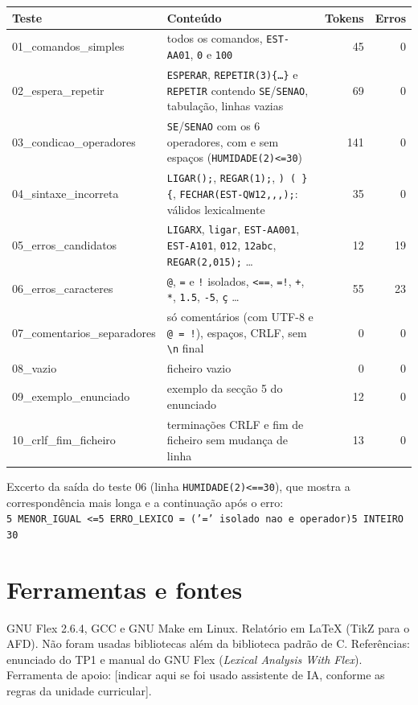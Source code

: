 \documentclass[10pt,a4paper]{article}
\newcommand{\tk}[1]{\texttt{#1}}
\begin{document}
\begin{center}\small
\begin{tabularx}{\textwidth}{@{}l>{\raggedright\arraybackslash}Xrr@{}}
\toprule
\textbf{Teste} & \textbf{Conteúdo} & \textbf{Tokens} & \textbf{Erros}\\
\midrule
01\_comandos\_simples & todos os comandos, \tk{EST-AA01}, \tk{0} e \tk{100} & 45 & 0\\
02\_espera\_repetir & \tk{ESPERAR}, \tk{REPETIR(3)\{\dots\}} e \tk{REPETIR} contendo \tk{SE}/\tk{SENAO}, tabulação, linhas vazias & 69 & 0\\
03\_condicao\_operadores & \tk{SE}/\tk{SENAO} com os 6 operadores, com e sem espaços (\tk{HUMIDADE(2)<=30}) & 141 & 0\\
04\_sintaxe\_incorreta & \tk{LIGAR();}, \tk{REGAR(1);}, \tk{) ( \} \{}, \tk{FECHAR(EST-QW12,,,);}: válidos lexicalmente & 35 & 0\\
05\_erros\_candidatos & \tk{LIGARX}, \tk{ligar}, \tk{EST-AA001}, \tk{EST-A101}, \tk{012}, \tk{12abc}, \tk{REGAR(2,015);} \dots & 12 & 19\\
06\_erros\_caracteres & \tk{@}, \tk{=} e \tk{!} isolados, \tk{<==}, \tk{=!}, \tk{+}, \tk{*}, \tk{1.5}, \tk{-5}, \tk{ç} \dots & 55 & 23\\
07\_comentarios\_separadores & só comentários (com UTF-8 e \tk{@ = !}), espaços, CRLF, sem \tk{\textbackslash n} final & 0 & 0\\
08\_vazio & ficheiro vazio & 0 & 0\\
09\_exemplo\_enunciado & exemplo da secção 5 do enunciado & 12 & 0\\
10\_crlf\_fim\_ficheiro & terminações CRLF e fim de ficheiro sem mudança de linha & 13 & 0\\
\bottomrule
\end{tabularx}
\end{center}

Excerto da saída do teste 06 (linha \tk{HUMIDADE(2)<==30}), que mostra a correspondência mais longa e a continuação após o erro:\\
\tk{5 MENOR\_IGUAL <=}\quad \tk{5 ERRO\_LEXICO = ('=' isolado nao e operador)}\quad \tk{5 INTEIRO 30}

\section{Ferramentas e fontes}
GNU Flex 2.6.4, GCC e GNU Make em Linux. Relatório em \LaTeX{} (TikZ para o AFD). Não foram usadas bibliotecas além
da biblioteca padrão de C. Referências: enunciado do TP1 e manual do GNU Flex (\emph{Lexical Analysis With Flex}).
Ferramenta de apoio: [indicar aqui se foi usado assistente de IA, conforme as regras da unidade curricular].
\end{document}
